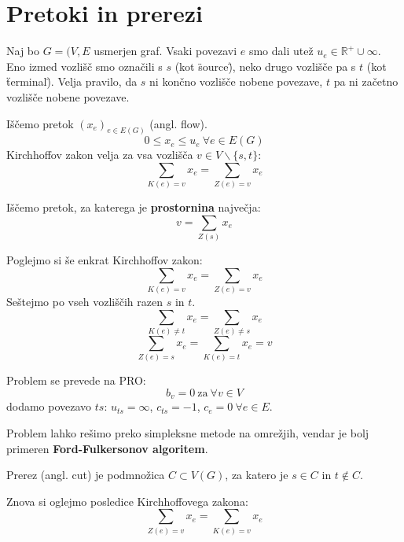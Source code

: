 \documentclass[11pt, a4paper]{article}
\begin{document}
    \pagebreak
    \section{Pretoki in prerezi}

    Naj bo \(G = (V,E\) usmerjen graf. Vsaki povezavi \(e\) smo dali utež \(u_e \in \mathbb{R}^+ \cup \infty\). Eno izmed vozlišč smo označili s \(s\) (kot \"source\"), neko drugo vozlišče pa s \(t\) (kot \"terminal\"). Velja pravilo, da \(s\) ni končno vozlišče nobene povezave, \(t\) pa ni začetno vozlišče nobene povezave.
    \par
    Iščemo pretok \((x_e)_{e \in E(G)}\) (angl. flow).
    \[
        0 \le x_e \le u_e\ \forall e \in E(G)    
    \] 
    Kirchhoffov zakon velja za vsa vozlišča \(v \in V \backslash \{s,t\}\):
    \[
        \sum_{K(e)=v} x_e = \sum_{Z(e)=v} x_e   
    \]

    Iščemo pretok, za katerega je \textbf{prostornina} največja:
    \[
        v = \sum_{Z(s)} x_e    
    \]

    Poglejmo si še enkrat Kirchhoffov zakon:
    \[
        \sum_{K(e)=v} x_e = \sum_{Z(e)=v} x_e  
    \]
    Seštejmo po vseh vozliščih razen \(s\) in \(t\).
    \[
        \sum_{K(e) \neq t} x_e = \sum_{Z(e) \neq s} x_e    
    \]
    \[
        \sum_{Z(e)=s} x_e = \sum_{K(e)=t} x_e = v
    \]

    Problem se prevede na PRO:
    \[
        b_v=0\ \text{za}\ \forall v \in V    
    \]
    dodamo povezavo \(ts\): \(u_{ts}=\infty\), \(c_{ts} = -1\), \(c_e=0\ \forall e \in E\).
    \par
    Problem lahko rešimo preko simpleksne metode na omrežjih, vendar je bolj primeren \textbf{Ford-Fulkersonov algoritem}.

    \begin{definition}
        Prerez (angl. cut) je podmnožica \(C \subset V(G)\), za katero je \(s \in C\) in \(t \notin C\).
    \end{definition}

    Znova si oglejmo posledice Kirchhoffovega zakona:
    \[
        \sum_{Z(e)=v} x_e = \sum_{K(e)=v} x_e  
    \]
\end{document}
